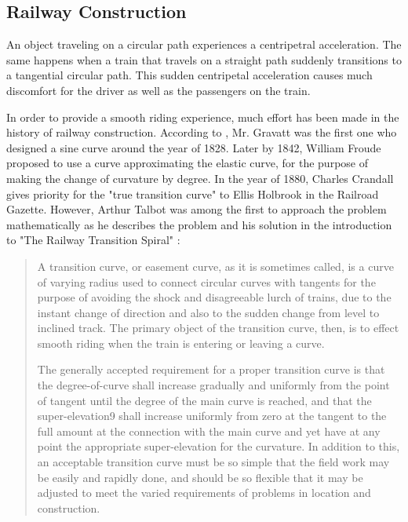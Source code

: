 \documentclass[12pt]{article}
\begin{document}
\FloatBarrier 
\subsection{Railway  Construction}

An object traveling on a circular path experiences a centripetral acceleration. The same happens when a train that travels on a straight path suddenly transitions to a tangential circular path. This sudden centripetal acceleration causes much discomfort for the driver as well as the passengers on the train. 

In order to provide a smooth riding experience, much effort has been made in the history of railway construction. According to \cite{Lev08}, Mr. Gravatt was the first one who designed a sine curve around the year of 1828. Later by 1842, William Froude proposed to use a curve approximating the elastic curve, for the purpose of making the change of curvature by degree. In the year of 1880, Charles Crandall gives priority for the "true transition curve" to Ellis Holbrook in the Railroad Gazette. However, Arthur Talbot was among the first to approach the problem mathematically as he describes the problem and his solution in the introduction to "The Railway Transition Spiral" \cite{Tal99}:

\begin{quotation}
	A transition curve, or easement curve, as it is sometimes called, is a curve of varying radius
	used to connect circular curves with tangents for the purpose of avoiding the shock and
	disagreeable lurch of trains, due to the instant change of direction and also to the sudden
	change from level to inclined track. The primary object of the transition curve, then, is to
	effect smooth riding when the train is entering or leaving a curve.
	
	The generally accepted requirement for a proper transition curve is that the degree-of-curve
	shall increase gradually and uniformly from the point of tangent until the degree of the main
	curve is reached, and that the super-elevation9
	shall increase uniformly from zero at the
	tangent to the full amount at the connection with the main curve and yet have at any point
	the appropriate super-elevation for the curvature. In addition to this, an acceptable transition
	curve must be so simple that the field work may be easily and rapidly done, and should be so
	flexible that it may be adjusted to meet the varied requirements of problems in location and
	construction.
\end{quotation}
\end{document}

